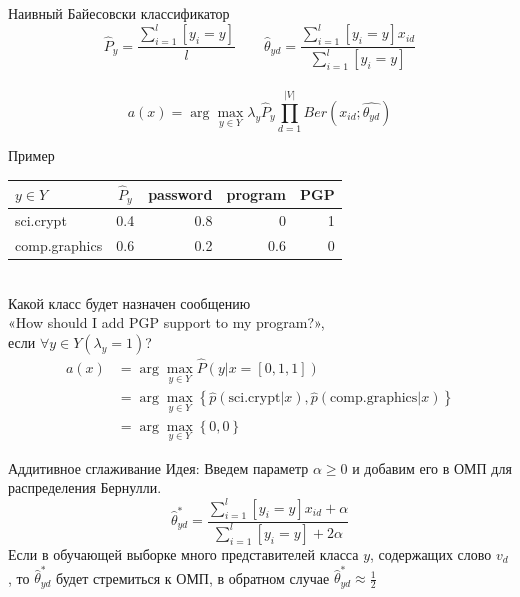 \documentclass[10pt]{beamer}
\begin{document}
\begin{frame}{Наивный Байесовски классификатор}
  $$\hat{P}_y = \frac{\sum\limits_{i=1}^l [y_i = y]}{l} \qquad \hat{\theta}_{yd} = \frac{\sum\limits_{i=1}^l [y_i = y] x_{id}}{\sum\limits_{i=1}^l [y_i = y]}$$\\
  \bigbreak
  \pause
  $$a(x) = \arg\max\limits_{y \in Y} \lambda_y \hat{P}_y \prod\limits_{d=1}^{|V|} Ber(x_{id}; \hat{\theta_{yd}})$$
\end{frame}

\begin{frame}{Пример}
  \centering
  \begin{tabular}{ l |c |r r r}
    $y \in Y$ & $\hat{P}_y$ & password & program & PGP \\
    \hline
    sci.crypt & 0.4 & 0.8 & 0 & 1 \\
    comp.graphics & 0.6 & 0.2 & 0.6 & 0\\
  \end{tabular}\\
  \bigbreak
  \pause
  Какой класс будет назначен сообщению \\«How should I add PGP support to my program?», \\если $\forall y \in Y (\lambda_y = 1)$? 
  \bigbreak
  \pause
  \begin{equation*}
    \begin{split}
    a(x) &= \arg\max\limits_{y \in Y} \hat{P}(y | x = [0, 1, 1]) \\
    & = \arg\max\limits_{y \in Y} \left\{\hat{p}(\text{sci.crypt}|x), \hat{p}(\text{comp.graphics}|x)\right\} \\
    & =  \arg\max\limits_{y \in Y} \left\{0, 0\right\}
    \end{split}
  \end{equation*}
\end{frame}

\begin{frame} {Аддитивное сглаживание}
  \alert{Идея}: Введем параметр $\alpha \geq 0$ и добавим его в ОМП для распределения Бернулли.\\
  $$\hat{\theta}_{yd}^* = \frac{\sum\limits_{i=1}^{l} [y_i = y] x_{id} + \alpha}{\sum\limits_{i=1}^{l} [y_i = y] + 2 \alpha}$$
  \bigbreak
  Если в обучающей выборке много представителей класса $y$, содержащих слово $v_d$, то $\hat{\theta}_{yd}^*$ будет стремиться к ОМП, в обратном случае $\hat{\theta}_{yd}^* \approx \frac{1}{2}$
\end{frame}
\end{document}
